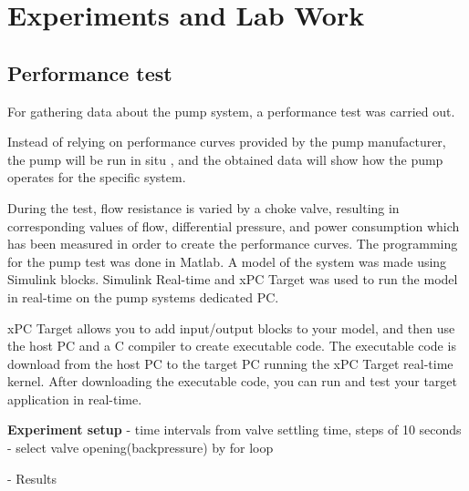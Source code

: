 \chapter{Experiments and Lab Work}\label{ch:experiment} 
\section{Performance test}\label{sec:performance_test} 
For gathering data about the pump system, a performance test was carried out.

Instead of relying on performance curves provided by the pump manufacturer,
the pump will be run in situ , 
and the obtained data will show how the pump operates for the specific system.
 
During the test, flow resistance is varied by a choke valve, resulting in 
corresponding values of flow, differential pressure, and power consumption 
which has been measured in order to create the performance curves.
\newline
\newline
The programming for the pump test was done in Matlab. 
A model of the system was made using Simulink blocks. 
Simulink Real-time and xPC Target was used to run the model in real-time 
on the pump systems dedicated PC. 


xPC Target allows you to add input/output blocks to your model, and then use the host 
PC and a C compiler to create executable code. The executable code is download 
from the host PC to the target PC running the xPC Target real-time kernel. 
After downloading the executable code, you can run and test your target 
application in real-time. 


\textbf{Experiment setup}
- time intervals from valve settling time, steps of 10 seconds
- select valve opening(backpressure) by for loop


- Results
 